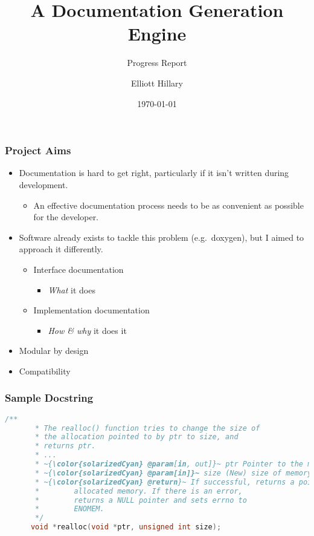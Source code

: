 \documentclass{beamer}
\title{A Documentation Generation Engine}
\subtitle{Progress Report}
\author{Elliott Hillary}
\date{\today}
\begin{document}
  \begin{frame}
    \titlepage
  \end{frame}
  \begin{frame}
    \frametitle{Project Aims}
      \begin{itemize}
        \item Documentation is hard to get right, particularly if it isn't
          written during development.
          \begin{itemize}
            \item An effective documentation process needs to be as convenient
              as possible for the developer.
          \end{itemize}
          \item Software already exists to tackle this problem (e.g.~doxygen),
            but I aimed to approach it differently.
            \begin{itemize}
              \item Interface documentation
                \begin{itemize}
                  \item \emph{What} it does
                \end{itemize}
              \item Implementation documentation
                  \begin{itemize}
                    \item \emph{How \& why} it does it
                  \end{itemize}
            \end{itemize}
          \item Modular by design
          \item Compatibility
      \end{itemize}
  \end{frame}

  \begin{frame}[fragile]
    \frametitle{Sample Docstring}
    \begin{lstlisting}[language=c, gobble=5, escapechar=~]
      /**
       * The realloc() function tries to change the size of
       * the allocation pointed to by ptr to size, and
       * returns ptr.
       * ...
       * ~{\color{solarizedCyan} @param[in, out]}~ ptr Pointer to the memory.
       * ~{\color{solarizedCyan} @param[in]}~ size (New) size of memory desired.
       * ~{\color{solarizedCyan} @return}~ If successful, returns a pointer to
       *        allocated memory. If there is an error,
       *        returns a NULL pointer and sets errno to
       *        ENOMEM.
       */
      void *realloc(void *ptr, unsigned int size);
    \end{lstlisting}
\end{frame}
\end{document}
